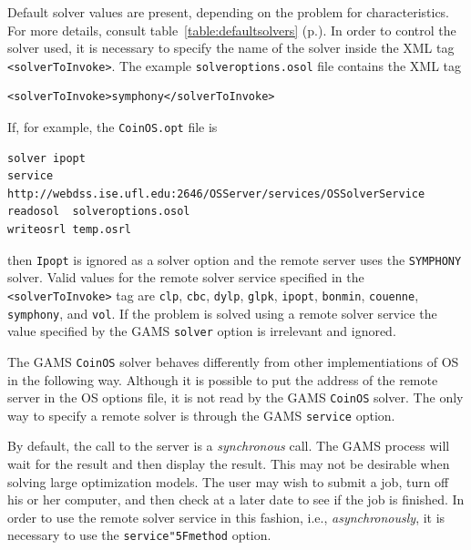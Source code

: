 \documentclass[11pt]{article}
\renewcommand{\_}{{\char"5F}}
\renewcommand{\{}{{\char"7B}}
\renewcommand{\}}{{\char"7D}}
\renewcommand{\^}{{\char"0D}}
\renewcommand{\'}{{\char"0D}}
\begin{document}
\begin{enumerate}[Step 1:]
Default solver values are present, depending on the problem for characteristics. For more details, consult 
table~\ref{table:defaultsolvers} (p.\pageref{table:defaultsolvers}).
In order to control the solver used, it is necessary to specify the name of the solver
inside the XML tag {\tt <solverToInvoke>}. The example  {\tt solveroptions.osol} file contains the XML tag
\begin{verbatim}
<solverToInvoke>symphony</solverToInvoke>
\end{verbatim}
If, for example,  the {\tt CoinOS.opt} file is
\begin{verbatim}
solver ipopt
service http://webdss.ise.ufl.edu:2646/OSServer/services/OSSolverService
readosol  solveroptions.osol
writeosrl temp.osrl
\end{verbatim}
then {\tt Ipopt} is ignored as a solver option and the remote server uses the {\tt  SYMPHONY} solver.  
Valid values for the remote solver service specified in the {\tt <solverToInvoke>} tag are {\tt clp},  
{\tt cbc},  {\tt dylp}, {\tt glpk}, {\tt ipopt}, {\tt bonmin},   {\tt couenne},  {\tt symphony}, and 
{\tt vol}.  If the problem is solved using a remote solver service the value specified by the GAMS {\tt solver} option is irrelevant and ignored. 

The GAMS {\tt CoinOS} solver behaves differently from other implementiations of OS
in the following way.  
Although it is  possible to put the address of the remote server in the OS options file, it is not read 
by the GAMS {\tt CoinOS} solver. The only way to specify a remote solver is through the GAMS  
{\tt service} option.



By default, the call to the server is a {\it synchronous} call. The GAMS process will wait for the result 
and then display the result. This may not be desirable when solving large optimization models.  
The user may wish to submit a job, turn off his or her computer,  and then check at a later date to see 
if the job is finished.  In order to use the remote solver service in this fashion, i.e., 
{\it asynchronously}, it  is necessary to use the  {\tt service\_method} option.


\end{enumerate}
\end{document}
